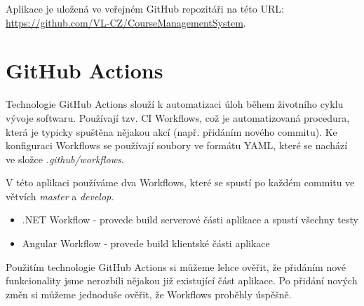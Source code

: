 Aplikace je uložená ve veřejném GitHub repozitáři na této URL: \url{https://github.com/VL-CZ/CourseManagementSystem}.

\section{GitHub Actions}
Technologie GitHub Actions slouží k automatizaci úloh během životního cyklu vývoje softwaru. Používají tzv. CI Workflows, což je automatizovaná procedura, která je typicky spuštěna nějakou akcí (např. přidáním nového commitu).
Ke konfiguraci Workflows se používají soubory ve formátu YAML, které se nachází ve složce \textit{.github/workflows}.
\cite{GitHubActionsDocs}

V této aplikaci používáme dva Workflows, které se spustí po každém commitu ve větvích \textit{master} a \textit{develop}.
\begin{itemize}
	\item .NET Workflow - provede build serverové části aplikace a spustí všechny testy
	\item Angular Workflow - provede build klientské části aplikace
\end{itemize}

Použitím technologie GitHub Actions si můžeme lehce ověřit, že přidáním nové funkcionality jsme nerozbili nějakou již existující část aplikace. Po přidání nových změn si můžeme jednoduše ověřit, že Workflows proběhly úspěšně.

